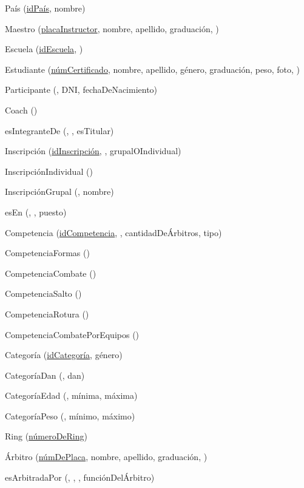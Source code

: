 \par País (\underline{idPaís}, nombre)

\par Maestro (\underline{placaInstructor}, nombre, apellido, graduación, )
\par Escuela (\underline{idEscuela}, )

\par Estudiante (\underline{númCertificado}, nombre, apellido, género, graduación, peso, foto, )
\par Participante (\underline{}, DNI, fechaDeNacimiento)
\par Coach (\underline{})

\par esIntegranteDe (\underline{}, \underline{}, esTitular)
\par Inscripción (\underline{idInscripción}, , grupalOIndividual)
\par InscripciónIndividual (\underline{})
\par InscripciónGrupal (\underline{}, nombre)

\par esEn (\underline{}, \underline{}, puesto)

\par Competencia (\underline{idCompetencia}, , cantidadDeÁrbitros, tipo)
\par CompetenciaFormas (\underline{})
\par CompetenciaCombate (\underline{})
\par CompetenciaSalto (\underline{})
\par CompetenciaRotura (\underline{})
\par CompetenciaCombatePorEquipos (\underline{})

\par Categoría (\underline{idCategoría}, género)
\par CategoríaDan (\underline{}, dan)
\par CategoríaEdad (\underline{}, mínima, máxima)
\par CategoríaPeso (\underline{}, mínimo, máximo)

\par Ring (\underline{númeroDeRing})
\par Árbitro (\underline{númDePlaca}, nombre, apellido, graduación, )

\par esArbitradaPor (\underline{}, \underline{}, , funciónDelÁrbitro)
